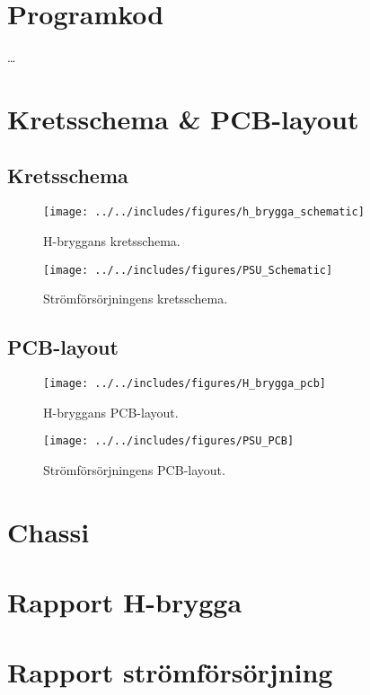 \appendix

\section{Programkod}
\ldots

\section{Kretsschema \& PCB-layout}
\subsection{Kretsschema}
\begin{landscape}
\begin{figure}[htbp!]
\centering
\texttt{[image: ../../includes/figures/h\_brygga\_schematic]}
\caption{H-bryggans kretsschema.}
\label{fig:appendix_h_brygga_schema}
\end{figure}
\end{landscape}

\begin{landscape}
\begin{figure}[htbp!]
\centering
\texttt{[image: ../../includes/figures/PSU\_Schematic]}
\caption{Strömförsörjningens kretsschema.}
\label{fig:appendix_PSU_schema}
\end{figure}
\end{landscape}

\subsection{PCB-layout}
\begin{figure}[htbp!]
\centering
\texttt{[image: ../../includes/figures/H\_brygga\_pcb]}
\caption{H-bryggans PCB-layout.}
\label{fig:appendix_pcb_layout}
\end{figure}

\begin{figure}[htbp!]
\centering
\texttt{[image: ../../includes/figures/PSU\_PCB]}
\caption{Strömförsörjningens PCB-layout.}
\label{fig:appendix_PSU_pcb_layout}
\end{figure}

\section{Chassi}


\newpage
\section{Rapport H-brygga}
\label{apx:H-bridge}


\section{Rapport strömförsörjning}
\label{apx:PSU}

